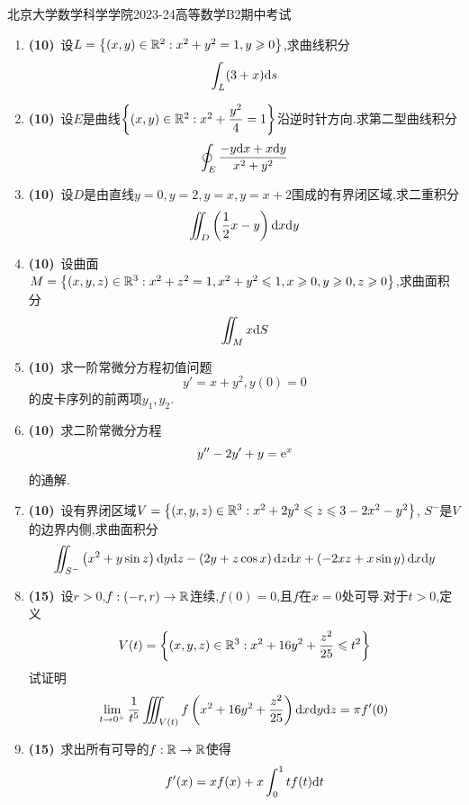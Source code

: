 \documentclass{ctexart}
\begin{document}
\pagestyle{empty}
\begin{center}\Large
    北京大学数学科学学院2023-24高等数学B2期中考试
\end{center}
\begin{enumerate}[leftmargin=*,label=\textbf{\arabic*.}]
    \item \textbf{(10)}\ 设$L=\left\{(x,y)\in\mathbb{R}^2:x^2+y^2=1,y\geqslant0\right\}$,求曲线积分
    \[\int_{L}(3+x)\mathrm{d} s\]

    \item \textbf{(10)}\ 设$E$是曲线$\left\{(x,y)\in\mathbb{R}^2:x^2+\dfrac{y^2}{4}=1\right\}$沿逆时针方向.求第二型曲线积分
    \[\oint_{E}\dfrac{-y\mathrm{d} x+x\mathrm{d} y}{x^2+y^2}\]

    \item \textbf{(10)}\ 设$D$是由直线$y=0,y=2,y=x,y=x+2$围成的有界闭区域,求二重积分
    \[\iint_D\left(\dfrac12x-y\right)\mathrm{d} x\mathrm{d} y\]

    \item \textbf{(10)}\ 设曲面$M=\left\{(x,y,z)\in\mathbb{R}^3:x^2+z^2=1,x^2+y^2\leqslant1,x\geqslant0,y\geqslant0,z\geqslant0\right\}$,求曲面积分
        \[\iint_{M}x\mathrm{d} S\]

    \item \textbf{(10)}\ 求一阶常微分方程初值问题
        \[y'=x+y^2,y(0)=0\]
        的皮卡序列的前两项$y_1,y_2$.

    \item \textbf{(10)}\ 求二阶常微分方程
        \[y''-2y'+y=\mathrm{e}^x\]
        的通解.

    \item \textbf{(10)}\ 设有界闭区域$V=\left\{(x,y,z)\in\mathbb{R}^3:x^2+2y^2\leqslant z\leqslant 3-2x^2-y^2\right\}$,%
        $S^-$是$V$的边界内侧,求曲面积分
        \[\iint_{S^-}\left(x^2+y\sin z\right)\mathrm{d} y\mathrm{d} z-\left(2y+z\cos x\right)\mathrm{d} z\mathrm{d} x+\left(-2xz+x\sin y\right)\mathrm{d} x\mathrm{d} y\]

    \item \textbf{(15)}\ 设$r>0$,$f:(-r,r)\to\mathbb{R}$连续,$f(0)=0$,且$f$在$x=0$处可导.对于$t>0$,定义
    \[V(t)=\left\{(x,y,z)\in\mathbb{R}^3:x^2+16y^2+\dfrac{z^2}{25}\leqslant t^2\right\}\]
    试证明
    \[\lim_{t\to0^+}\dfrac{1}{t^5}\iiint_{V(t)}f\left(x^2+16y^2+\dfrac{z^2}{25}\right)\mathrm{d} x\mathrm{d} y\mathrm{d} z=\pi f'(0)\]

    \item \textbf{(15)}\ 求出所有可导的$f:\mathbb{R}\to\mathbb{R}$使得
    \[f'(x)=xf(x)+x\int_0^1tf(t)\mathrm{d} t\]

\end{enumerate}
\end{document}
